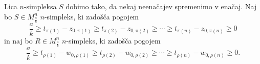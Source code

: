 \documentclass[mat1]{fmfdelo}
\newcommand{\0}{0}
\begin{document}
Lica $n$-simpleksa $S$ dobimo tako, da nekaj neenačajev spremenimo v enačaj. Naj bo $S \in M_{\frac{a}{k}}^n$ $n$-simpleks, ki zadošča pogojem
\begin{equation}\label{eq:pogojiS}
\frac{a}{k} \geq t_{\pi(1)} - z_{0, \pi(1)}  \geq t_{\pi(2)} - z_{0, \pi(2)} \geq \cdots \geq t_{\pi(n)} - z_{0, \pi(n)} \geq 0
\end{equation}
in naj bo $R \in M_{\frac{a}{k}}^n$ $n$-simpleks, ki zadošča pogojem
\begin{equation}\label{eq:pogojiR}
\frac{a}{k} \geq t_{\rho(1)} - w_{0, \rho(1)}  \geq t_{\rho(2)} - w_{0, \rho(2)} \geq \cdots \geq t_{\rho(n)} - w_{0, \rho(n)} \geq 0.
\end{equation}
\end{document}
